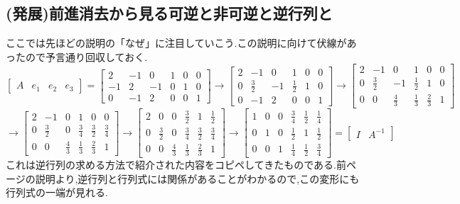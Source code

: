 \subsection{(発展)前進消去から見る可逆と非可逆と逆行列と}
ここでは先ほどの説明の「なぜ」に注目していこう.この説明に向けて伏線があったので予言通り回収しておく.
\[
\begin{bmatrix}A & e_1 & e_2 & e_3 \end{bmatrix}=
\begin{bmatrix}
2 & -1 & 0 & 1 & 0 & 0 \\
-1 & 2 & -1 & 0 & 1 & 0 \\
0 & -1 & 2  & 0 & 0 & 1
\end{bmatrix}
\rightarrow
\begin{bmatrix}
2 & -1 & 0 & 1 & 0 & 0 \\
0 & \frac{3}{2} & -1 & \frac{1}{2} & 1 & 0 \\
0 & -1 & 2  & 0 &0 & 1
\end{bmatrix}
\rightarrow
\begin{bmatrix}
2 & -1 & 0 & 1 & 0 & 0 \\
0 & \frac{3}{2} & -1 & \frac{1}{2} & 1 & 0 \\
0 & 0 & \frac{4}{3} & \frac{1}{3} & \frac{2}{3} & 1
\end{bmatrix}
\]
\[
\rightarrow
\begin{bmatrix}
2 & -1 & 0 & 1 & 0 & 0 \\
0 & \frac{3}{2} & 0 & \frac{3}{4} & \frac{3}{2} & \frac{3}{4} \\
0 & 0 & \frac{4}{3} & \frac{1}{3} & \frac{2}{3} & 1
\end{bmatrix}
\rightarrow
\begin{bmatrix}
2 & 0 & 0 & \frac{3}{2} & 1 & \frac{1}{2} \\
0 & \frac{3}{2} & 0 & \frac{3}{4} & \frac{3}{2} & \frac{3}{4} \\
0 & 0 & \frac{4}{3} & \frac{1}{3} & \frac{2}{3} & 1
\end{bmatrix}
\rightarrow
\begin{bmatrix}
1 & 0 & 0 & \frac{3}{4} & \frac{1}{2} & \frac{1}{4} \\
0 & 1 & 0 & \frac{1}{2} & 1 & \frac{1}{2} \\
0 & 0 & 1 & \frac{1}{4} & \frac{1}{2} & \frac{3}{4}
\end{bmatrix}=
\begin{bmatrix}
    I & A^{-1}
\end{bmatrix}
\]
これは逆行列の求める方法で紹介された内容をコピペしてきたものである.前ページの説明より,逆行列と行列式には関係があることがわかるので,この変形にも行列式の一端が見れる.\\
